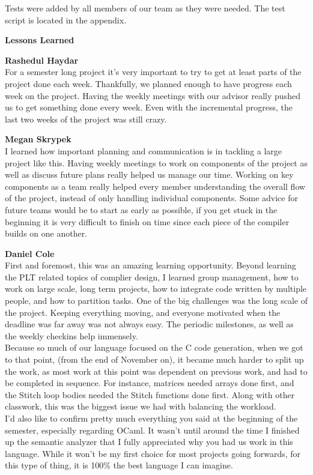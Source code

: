 \documentclass[11pt, oneside]{article}   	%
\newcommand{\tab} {\hspace*{2em}}
\begin{document}
Tests were added by all members of our team as they were needed. The test script is located in the appendix.


\newpage
\LARGE\textbf{Lessons Learned}\\[2em]
\normalsize

\Large\textbf{Rashedul Haydar}\\[1em]
\normalsize
\tab For a semester long project it's very important to try to get at least parts of the project done each week. Thankfully, we planned enough to have progress each week on the project. Having the weekly meetings with our advisor really pushed us to get something done every week. Even with the incremental progress, the last two weeks of the project was still crazy. 

\newpage
\Large\textbf{Megan Skrypek}\\[1em]
\normalsize
\tab I learned how important planning and communication is in tackling a large project like this. Having weekly meetings to work on components of the project as well as discuss future plans really helped us manage our time. Working on key components as a team really helped every member understanding the overall flow of the project, instead of only handling individual components. Some advice for future teams would be to start as early as possible, if you get stuck in the beginning it is very difficult to finish on time since each piece of the compiler builds on one another.

\newpage
\Large\textbf{Daniel Cole}\\[1em]
\normalsize
\tab First and foremost, this was an amazing learning opportunity.  Beyond learning the PLT related topics of complier design, I learned group management, how to work on large scale, long term projects, how to integrate code written by multiple people, and how to partition tasks.  One of the big challenges was the long scale of the project.  Keeping everything moving, and everyone motivated when the deadline was far away was not always easy.  The periodic milestones, as well as the weekly checkins help immensely.\\[.5em]
\tab Because so much of our language focused on the C code generation, when we got to that point, (from the end of November on), it became much harder to split up the work, as most work at this point was dependent on previous work, and had to be completed in sequence.  For instance, matrices needed arrays done first, and the Stitch loop bodies needed the Stitch functions done first.  Along with other classwork, this was the biggest issue we had with balancing the workload.\\[.5em]
\tab I'd also like to confirm pretty much everything you said at the beginning of the semester, especially regarding OCaml.  It wasn't until around the time I finished up the semantic analyzer that I fully appreciated why you had us work in this language.  While it won't be my first choice for most projects going forwards, for this type of thing, it is 100\% the best language I can imagine.
\end{document}
